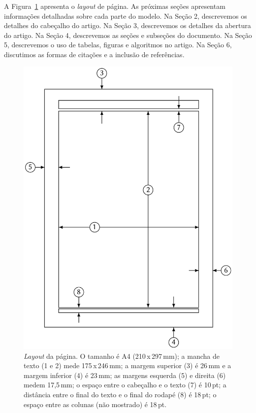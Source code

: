 \documentclass[portuguese,notblind]{sbc20}
\begin{document}
A Figura~\ref{fig:page-layout} apresenta o \emph{layout} de página. As próximas seções apresentam informações detalhadas sobre cada parte do modelo. Na Seção 2, descrevemos os detalhes do cabeçalho do artigo. Na Seção 3, descrevemos os detalhes da abertura do artigo. Na Seção 4, descrevemos as seções e subseções do documento. Na Seção 5, descrevemos o uso de tabelas, figuras e algoritmos no artigo. Na Seção 6, discutimos as formas de citações e a inclusão de referências.

\begin{figure}
  \includegraphics[width=\columnwidth]{figures/page-layout}
  \caption{\emph{Layout} da página. O tamanho é A4 (210\,x\,297\,mm);
  a mancha de texto (1 e 2) mede 175\,x\,246\,mm; a margem superior
  (3) é 26\,mm e a margem inferior (4) é 23\,mm; as margens esquerda
  (5) e direita (6) medem 17,5\,mm; o espaço entre o cabeçalho e o
  texto (7) é 10\,pt; a distância entre o final do texto e o final do
  rodapé (8) é 18\,pt; o espaço entre as colunas (não mostrado) é
  18\,pt.\label{fig:page-layout}}
\end{figure}
\end{document}
